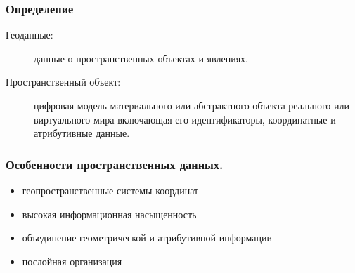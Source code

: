 

\begin{frame}
    \frametitle{Определение}
    \begin{description}
        \item[Геоданные:] данные о пространственных объектах и явлениях.
        \item[Пространственный объект:] цифровая модель материального или абстрактного объекта реального или виртуального мира включающая его идентификаторы, координатные и атрибутивные данные.
    \end{description}
\end{frame}

\begin{frame}
    \frametitle{Особенности пространственных данных.}
    \begin{itemize}
        \item геопространственные системы координат
        \item высокая информационная насыщенность
        \item объединение геометрической и атрибутивной информации
        \item послойная организация
    \end{itemize}
\end{frame}

